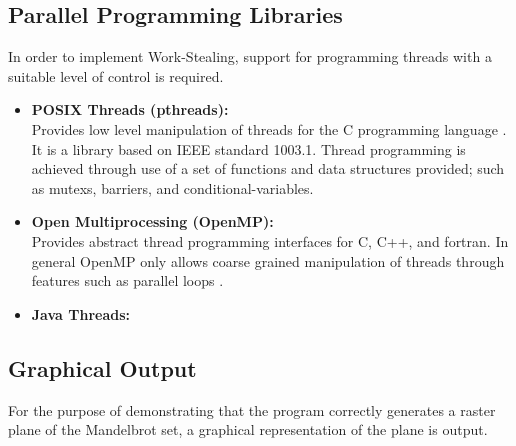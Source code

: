 \subsection*{Parallel Programming Libraries}
In order to implement Work-Stealing, support for programming threads 
with a suitable level of control is required.

\begin{itemize}
\item \textbf{POSIX Threads (pthreads):} \\ 
              Provides low level manipulation of threads for the C programming language \cite{pthreadover}. 
              It is a library based on IEEE standard 1003.1. Thread programming is achieved through use of a set of functions and data
              structures provided; such as \glspl{mutex}, \glspl{barrier}, and \glspl{conditional-variable}. %
             
\item \textbf{Open Multiprocessing (OpenMP):} \\ 
              Provides abstract thread programming interfaces for C, C++, and fortran.
              In general OpenMP only allows coarse grained manipulation of threads through features such as parallel loops %
              \cite{ompvspthr}.

\item \textbf{Java Threads:} \\ %
\end{itemize}

\subsection*{Graphical Output}
For the purpose of demonstrating that the program correctly generates a raster plane
of the Mandelbrot set, a graphical representation of the plane is output.

